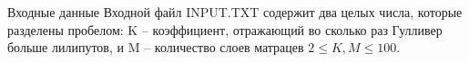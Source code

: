 Входные данные
Входной файл INPUT.TXT содержит два целых числа, которые разделены пробелом: K -- коэффициент, отражающий во сколько раз Гулливер больше лилипутов, и M -- количество слоев матрацев $2 \le K, M \le 100$.